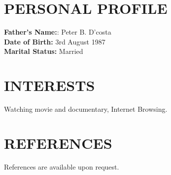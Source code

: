 \documentclass[margin]{res}
\begin{document}
\begin{resume}
\section{PERSONAL PROFILE}
\textbf{Father's Name:}: Peter B. D'costa 
\\
\textbf{Date of Birth:} 3rd August 1987
\\
\textbf{Marital Status:} Married


\section{INTERESTS}
Watching movie and documentary, Internet Browsing.


\section{REFERENCES}
References are available upon request.

\end{resume}
\end{document}
